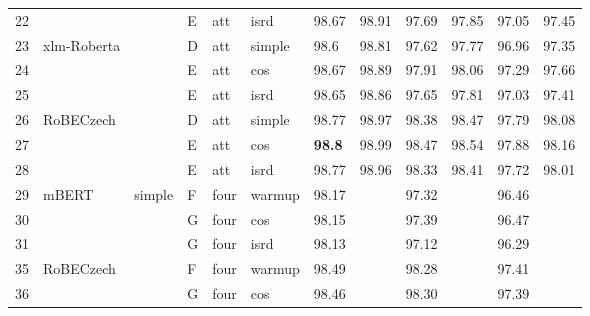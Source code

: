 \begin{table}[!h]
{\begin{tabular}{|l|l|l|l|l|l||llllll|}
22 &                              &                         & E	& att              & isrd   & 98.67  & 98.91   & 97.69   & 97.85    & 97.05     & 97.45      \\ \cline{1-2} \cline{4-12}
23 & \multirow{3}{*}{xlm-Roberta} &                         & D	& att      & simple & 98.6   & 98.81   & 97.62   & 97.77    & 96.96     & 97.35      \\ \cline{1-1} \cline{4-12}
24 &                              &                         & E	& att              & cos    & 98.67  & 98.89   & 97.91   & 98.06    & 97.29     & 97.66      \\ \cline{1-1} \cline{4-12}
25 &                              &                         & E	& att              & isrd   & 98.65  & 98.86   & 97.65   & 97.81    & 97.03     & 97.41      \\ \cline{1-2} \cline{4-12}
26 & \multirow{3}{*}{RoBECzech}   &                         & D	& att      & simple & 98.77  & 98.97   & 98.38   & 98.47    & 97.79     & 98.08      \\ \cline{1-1} \cline{4-12}
27 &                              &                         & E	& att              & cos    & \textbf{98.8}   & 98.99   & 98.47   & 98.54    & 97.88     & 98.16      \\ \cline{1-1} \cline{4-12}
28 &                              &                         & E	& att              & isrd   & 98.77  & 98.96   & 98.33   & 98.41    & 97.72     & 98.01      \\ \hline
29 & \multirow{3}{*}{mBERT}       & \multirow{9}{*}{simple} & F	& four                     & warmup & 98.17  &         & 97.32   &          & 96.46     &            \\ \cline{1-1} \cline{4-12}
30 &                              &                         & G	& four                     & cos    & 98.15  &         & 97.39   &          & 96.47     &            \\ \cline{1-1} \cline{4-12}
31 &                              &                         & G	& four                     & isrd   & 98.13  &         & 97.12   &          & 96.29     &            \\ \cline{1-2} \cline{4-12}
35 & \multirow{3}{*}{RoBECzech}   &                         & F	& four                     & warmup & 98.49  &         & 98.28   &          & 97.41     &            \\ \cline{1-1} \cline{4-12}
36 &                              &                         & G	& four                     & cos    & 98.46  &         & 98.30   &          & 97.39     &            \\ \cline{1-1} \cline{4-12}

\end{tabular}}
\end{table}
